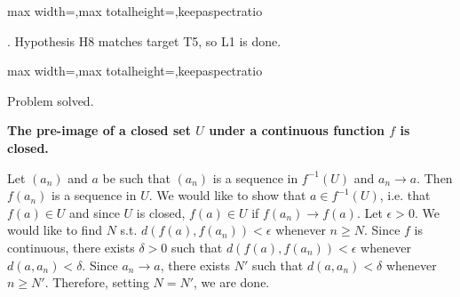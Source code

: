 \documentclass[a4paper,twoside,12pt]{article} %
\makeatletter
\DeclareRobustCommand{\_}{%
  \leavevmode\vbox{%
    \hrule\@width.4em
          \@height-.16ex
          \@depth\dimexpr.16ex+.28pt\relax}}
\newcommand\Tstrut{\rule{0pt}{2.4ex}}
\newcommand\Bstrut{\rule[-1.1ex]{0pt}{0pt}}
\newcommand\grey[1]{{\color{greycolour}{#1}}}
\newenvironment{fit}{\begin{adjustbox}{max width=\textwidth,max totalheight=\textheight,keepaspectratio}}{\end{adjustbox}}
\makeatother
\begin{document}
\begin{steps}
\begin{fit}
%
\end{fit}
\smallskip

. Hypothesis H8 matches target T5, so L1 is done.\nopagebreak[4] 
\nopagebreak[4] 
\smallskip\nopagebreak[4] 

\begin{fit}%
\end{fit}

Problem solved.
\cleardoublepage

\end{steps}
{\begin{center} \large \textbf{The pre-image of a closed set $U$ under a continuous function $f$ is closed.}\end{center}}\nopagebreak[4]

\begin{center}
\begin{minipage}{120mm}
Let $(a_n)$ and $a$ be such that $(a_n)$ is a sequence in $f^{-1}(U)$ and $a_n\to a$. Then $f(a_n)$ is a sequence in $U$. We would like to show that $a\in f^{-1}(U)$, i.e. that $f(a)\in U$ and since $U$ is closed, $f(a)\in U$ if $f(a_n)\to f(a)$. Let $\epsilon > 0$. We would like to find $N$ s.t. $\textit{d}(f(a),f(a_{n})) < \epsilon$\textrm{ whenever }$n\geqslant N$. Since $f$ is continuous, there exists $\delta > 0$ such that $\textit{d}(f(a),f(a_{n})) < \epsilon$ whenever $\textit{d}(a,a_{n}) < \delta$. Since $a_n\to a$, there exists $N'$ such that $\textit{d}(a,a_{n}) < \delta$ whenever $n\geqslant N'$. Therefore, setting $N = N'$, we are done.
\end{minipage}
\end{center}
\end{document}
